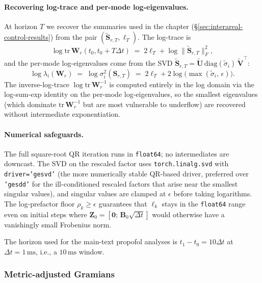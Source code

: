 \paragraph{Recovering log-trace and per-mode log-eigenvalues.}
At horizon $T$ we recover the summaries used in the chapter (\S\ref{sec:interareal-control-results}) from the pair $(\tilde{\mathbf{S}}_{r,T},\ell_{T})$. The log-trace is
\begin{equation}
\log\mathrm{tr}\,\mathbf{W}_{r}(t_{0},t_{0}+T\Delta t) \;=\; 2\ell_{T} + \log\bigl\|\tilde{\mathbf{S}}_{r,T}\bigr\|_{F}^{2},
\end{equation}
and the per-mode log-eigenvalues come from the SVD $\tilde{\mathbf{S}}_{r,T}=\tilde{\mathbf{U}}\,\mathrm{diag}(\tilde{\sigma}_{i})\,\tilde{\mathbf{V}}^{\!\top}$:
\begin{equation}
\log\lambda_{i}(\mathbf{W}_{r}) \;=\; \log\sigma_{i}^{2}(\mathbf{S}_{r,T}) \;=\; 2\ell_{T} + 2\log\bigl(\max(\tilde{\sigma}_{i},\,\epsilon)\bigr).
\end{equation}
The inverse-log-trace $\log\mathrm{tr}\,\mathbf{W}_{r}^{-1}$ is computed entirely in the log domain via the log-sum-exp identity on the per-mode log-eigenvalues, so the smallest eigenvalues (which dominate $\mathrm{tr}\,\mathbf{W}_{r}^{-1}$ but are most vulnerable to underflow) are recovered without intermediate exponentiation.

\paragraph{Numerical safeguards.}
The full square-root QR iteration runs in \texttt{float64}; no intermediates are downcast. The SVD on the rescaled factor uses \texttt{torch.linalg.svd} with \texttt{driver='gesvd'} (the more numerically stable QR-based driver, preferred over \texttt{'gesdd'} for the ill-conditioned rescaled factors that arise near the smallest singular values), and singular values are clamped at $\epsilon$ before taking logarithms. The log-prefactor floor $\rho_{k}\geq\epsilon$ guarantees that $\ell_{k}$ stays in the \texttt{float64} range even on initial steps where $\mathbf{Z}_{0}=[\mathbf{0};\,\mathbf{B}_{0}\sqrt{\Delta t}]$ would otherwise have a vanishingly small Frobenius norm.

The horizon used for the main-text propofol analyses is $t_1 - t_0=10\Delta t$ at $\Delta t=1\,\mathrm{ms}$, i.e., a $10\,\mathrm{ms}$ window.

\subsubsection{Metric-adjusted Gramians}\label{supp:interareal-control-gramian-metric}

